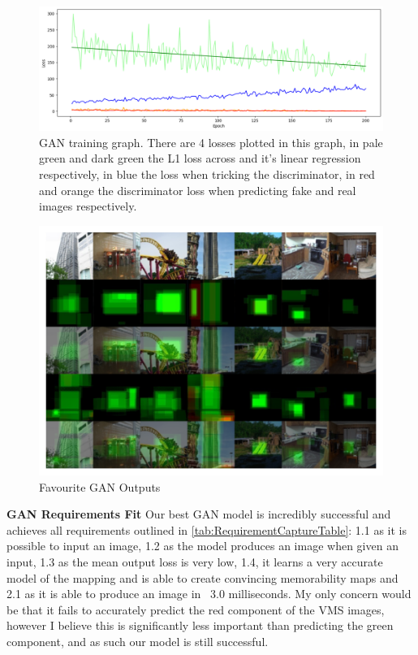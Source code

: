 \documentclass{UoYCSproject}
\begin{document}
\begin{figure}[ht]
    \centering
    \includegraphics[width=\linewidth]{GAN Training Curve}
    \caption{GAN training graph. There are 4 losses plotted in this graph, in pale green and dark green the L1 loss across and it's linear regression respectively, in blue the loss when tricking the discriminator, in red and orange the discriminator loss when predicting fake and real images respectively.}
    \label{fig:GANTraining}
\end{figure}

\begin{figure}[ht]
    \centering
    \includegraphics[width=\linewidth]{Good GAN Outputs}
    \caption{Favourite GAN Outputs}
    \label{fig:GANGoodOutput}
\end{figure}

\textbf{GAN Requirements Fit}
Our best GAN model is incredibly successful and achieves all requirements outlined in \ref{tab:RequirementCaptureTable}: 1.1 as it is possible to input an image, 1.2 as the model produces an image when given an input, 1.3 as the mean output loss is very low, 1.4, it learns a very accurate model of the mapping and is able to create convincing memorability maps and 2.1 as it is able to produce an image in ~3.0 milliseconds. My only concern would be that it fails to accurately predict the red component of the VMS images, however I believe this is significantly less important than predicting the green component, and as such our model is still successful.
\end{document}
